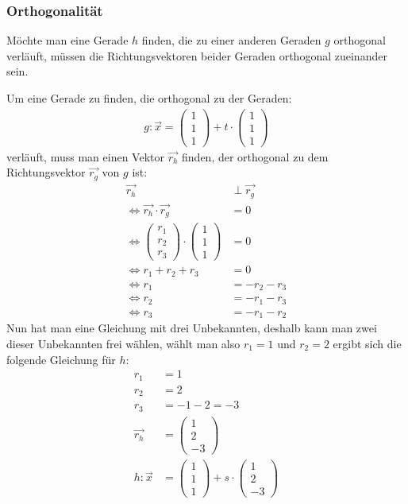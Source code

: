 \subsubsection{Orthogonalität}
\begin{flushleft}
Möchte man eine Gerade $h$ finden, die zu einer anderen Geraden $g$ orthogonal verläuft, müssen die Richtungsvektoren beider Geraden orthogonal zueinander sein.

Um eine Gerade zu finden, die orthogonal zu der Geraden:
\begin{align}
    g\colon\vec{x}=\begin{pmatrix} 1 \\ 1 \\ 1 \end{pmatrix}+t\cdot\begin{pmatrix} 1 \\ 1 \\ 1 \end{pmatrix}
\end{align}
verläuft, muss man einen Vektor $\vec{r_h}$ finden, der orthogonal zu dem Richtungsvektor $\vec{r_g}$ von $g$ ist:
\begin{align}
    \vec{r_h}&\perp\vec{r_g} \\
    \Leftrightarrow \vec{r_h}\cdot\vec{r_g}&=0 \\
    \Leftrightarrow \begin{pmatrix} r_1 \\ r_2 \\ r_3 \end{pmatrix}\cdot\begin{pmatrix} 1 \\ 1 \\ 1 \end{pmatrix}&=0 \\
    \Leftrightarrow r_1+r_2+r_3&=0 \\
    \Leftrightarrow r_1&=-r_2-r_3 \\
    \Leftrightarrow r_2&=-r_1-r_3 \\
    \Leftrightarrow r_3&=-r_1-r_2
\end{align}
Nun hat man eine Gleichung mit drei Unbekannten, deshalb kann man zwei dieser Unbekannten frei wählen, wählt man also $r_1=1$ und $r_2=2$ ergibt sich die folgende Gleichung für $h$:
\begin{align}
    r_1&=1 \\
    r_2&=2 \\
    r_3&=-1-2=-3 \\
    \vec{r_h}&=\begin{pmatrix} 1 \\ 2 \\ -3 \end{pmatrix} \\
    h\colon\vec{x}&=\begin{pmatrix} 1 \\ 1 \\ 1 \end{pmatrix}+s\cdot\begin{pmatrix} 1 \\ 2 \\ -3 \end{pmatrix}
\end{align}
\end{flushleft}
